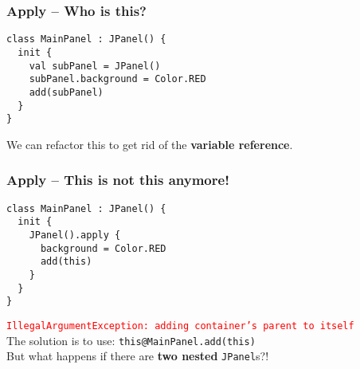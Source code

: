 \begin{frame}[fragile] \frametitle{Apply -- Who is this?}
\begin{lstlisting}
class MainPanel : JPanel() {
  init {
    val subPanel = JPanel()
    subPanel.background = Color.RED
    add(subPanel)
  }
}
\end{lstlisting}
\pause
We can refactor this to get rid of the \textbf{variable reference}.
\end{frame}


\begin{frame}[fragile] \frametitle{Apply -- This is not this anymore!}
\begin{lstlisting}
class MainPanel : JPanel() {
  init {
    JPanel().apply {
      background = Color.RED
      add(this)
    }
  }
}
\end{lstlisting}
\pause
\footnotesize{\texttt{\textcolor{red}{IllegalArgumentException: adding container's parent to itself}}}
\pause
\\
\vspace{0.5cm}
The solution is to use: \texttt{this\textcolor{someBlue}{@MainPanel}.add(this)}\pause \\
But what happens if there are \textbf{two nested} \texttt{JPanel}s?!
\end{frame}




